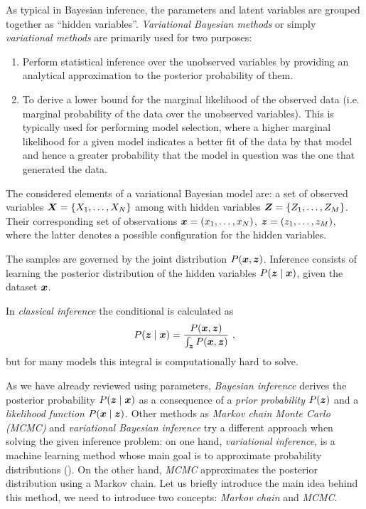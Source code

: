 
As typical in Bayesian inference, the parameters and latent variables are grouped together as ``hidden variables''. \emph{Variational Bayesian methods} or simply \emph{variational methods} are primarily used for two purposes:

 \begin{enumerate}  \setlength{\itemsep}{1pt}
   \item Perform statistical inference over the unobserved variables by providing an analytical approximation to the posterior probability of them.
   \item To derive a lower bound for the marginal likelihood of the observed data (i.e. marginal probability of the data over the unobserved variables). This is typically used for performing model selection, where a higher marginal likelihood for a given model indicates a better fit of the data by that model and hence a greater probability that the model in question was the one that generated the data.
 \end{enumerate}

 The considered elements of a variational Bayesian model are: a set of observed variables \(\bm{X} = \{X_{1},\dots,X_{N}\}\) among with hidden variables \(\bm{Z} = \{Z_{1},\dots,Z_{M}\}\). Their corresponding set of observations \(\bm{x} = (x_{1},\dots, x_{N})\),  \(\bm{z} = (z_{1}, \dots, z_{M})\), where the latter denotes a possible configuration for the hidden variables.

The samples are governed by the joint distribution \(P(\bm{x}, \bm{z})\). Inference consists of learning the posterior distribution of the hidden variables \(P(\bm{z} \mid \bm{x})\), given the dataset \(\bm{x}\).

In \emph{classical inference} the conditional is calculated as
\[
  P(\bm{z} \mid \bm{x}) = \frac{P(\bm{x}, \bm{z})}{\int_{\bm{z}} P(\bm{x},\bm{z})}\ ,
\]
but for many models this integral is computationally hard to solve.

As we have already reviewed using parameters, \emph{Bayesian inference} derives the posterior probability \(P(\bm{z} \mid \bm{x})\) as a consequence of a \emph{prior probability} \(P(\bm{z})\) and a \emph{likelihood function} \(P(\bm{x} \mid \bm{z})\). Other methods as \emph{Markov chain Monte Carlo (MCMC)} and \emph{variational Bayesian inference} try a different approach when solving the given inference problem: on one hand, \emph{variational inference}, is a machine learning method whose main goal is to approximate probability distributions (\cite{jordan1999introduction, wainwright}). On the other hand, \emph{MCMC} approximates the posterior distribution using a Markov chain. Let us briefly introduce the main idea behind this method, we need to introduce two concepts: \emph{Markov chain} and \emph{MCMC}.

